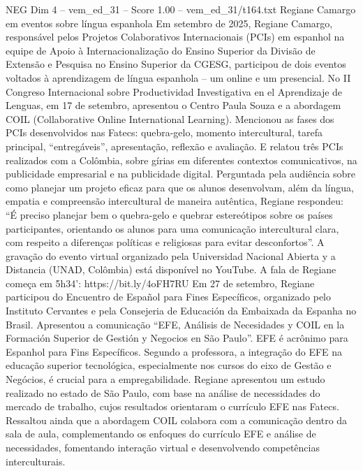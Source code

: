\begin{textsample}{NEG Dim 4 – vem\_ed\_31 – Score 1.00 – vem\_ed\_31/t164.txt}  \label{ex:f4_neg_024}
Regiane Camargo em eventos sobre língua espanhola Em setembro de 2025, Regiane Camargo, responsável pelos Projetos Colaborativos Internacionais (PCIs) em espanhol na equipe de Apoio à Internacionalização do Ensino Superior da Divisão de Extensão e Pesquisa no Ensino Superior da CGESG, participou de dois eventos voltados à aprendizagem de língua espanhola – um online e um presencial.
No II Congreso Internacional sobre Productividad Investigativa en el Aprendizaje de Lenguas, em 17 de setembro, apresentou o Centro Paula Souza e a abordagem COIL (Collaborative Online International Learning).
Mencionou as fases dos PCIs desenvolvidos nas Fatecs: quebra-gelo, momento intercultural, tarefa principal, “entregáveis”, apresentação, reflexão e avaliação.
E relatou três PCIs realizados com a Colômbia, sobre gírias em diferentes contextos comunicativos, na publicidade empresarial e na publicidade digital.
Perguntada pela audiência sobre como planejar um projeto eficaz para que os alunos desenvolvam, além da língua, empatia e compreensão intercultural de maneira autêntica, Regiane respondeu: “É preciso planejar bem o quebra-gelo e quebrar estereótipos sobre os países participantes, orientando os alunos para uma comunicação intercultural clara, com respeito a diferenças políticas e religiosas para evitar desconfortos”.
A gravação do evento virtual organizado pela Universidad Nacional Abierta y a Distancia (UNAD, Colômbia) está disponível no YouTube.
A fala de Regiane começa em 5h34’: https://bit.ly/4oFH7RU Em 27 de setembro, Regiane participou do Encuentro de Español para Fines Específicos, organizado pelo Instituto Cervantes e pela Consejeria de Educación da Embaixada da Espanha no Brasil.
Apresentou a comunicação “EFE, Análisis de Necesidades y COIL en la Formación Superior de Gestión y Negocios en São Paulo”.
EFE é acrônimo para Espanhol para Fins Específicos.
Segundo a professora, a integração do EFE na educação superior tecnológica, especialmente nos cursos do eixo de Gestão e Negócios, é crucial para a empregabilidade.
Regiane apresentou um estudo realizado no estado de São Paulo, com base na análise de necessidades do mercado de trabalho, cujos resultados orientaram o currículo EFE nas Fatecs.
Ressaltou ainda que a abordagem COIL colabora com a comunicação dentro da sala de aula, complementando os enfoques do currículo EFE e análise de necessidades, fomentando interação virtual e desenvolvendo competências interculturais.

\end{textsample}
